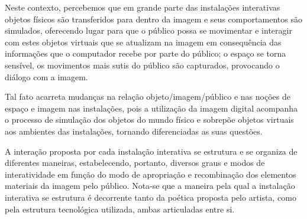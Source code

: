 Neste contexto, percebemos que em grande parte das instalações interativas objetos físicos são transferidos para dentro da imagem e seus comportamentos são simulados, oferecendo lugar para que o público possa se movimentar e interagir com estes objetos virtuais que se atualizam na imagem em consequência das informações que o computador recebe por parte do público; o espaço se torna sensível, os movimentos mais sutis do público são capturados, provocando o diálogo com a imagem. \cite[p. 6]{bochio}

Tal fato acarreta mudanças na relação objeto/imagem/público e nas noções de espaço e imagem nas instalações, pois a utilização da imagem digital acompanha o processo de simulação dos objetos do mundo físico e sobrepõe objetos virtuais aos ambientes das instalações, tornando diferenciadas as suas questões. \cite[p. 6]{bochio}

A interação proposta por cada instalação interativa se estrutura e se organiza de diferentes maneiras, estabelecendo, portanto, diversos graus e modos de interatividade em função do modo de apropriação e recombinação dos elementos materiais da imagem
pelo público. Nota-se que a maneira pela qual a instalação interativa se estrutura é decorrente tanto da poética proposta pelo artista, como pela estrutura tecnológica utilizada, ambas articuladas entre si. \cite[p. 6-7]{bochio}


